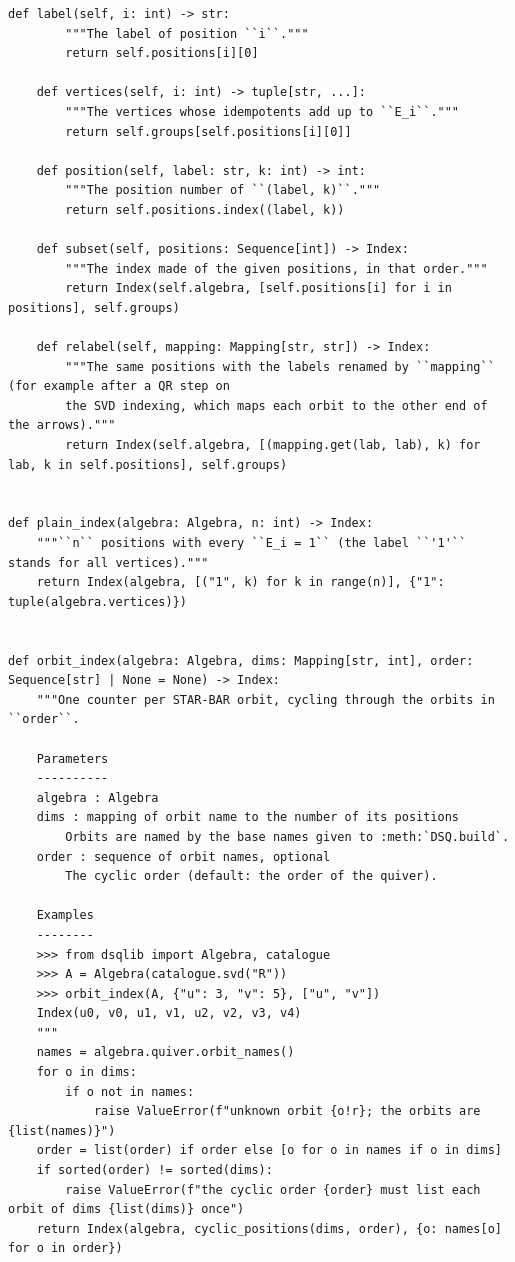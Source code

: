 \documentclass[12pt, a4paper]{report}
\theoremstyle{plain}
\theoremstyle{definition}
\theoremstyle{remark}
\theoremstyle{plain}
\begin{document}
\begin{lstlisting}[style=dsqcode]
    def label(self, i: int) -> str:
        """The label of position ``i``."""
        return self.positions[i][0]

    def vertices(self, i: int) -> tuple[str, ...]:
        """The vertices whose idempotents add up to ``E_i``."""
        return self.groups[self.positions[i][0]]

    def position(self, label: str, k: int) -> int:
        """The position number of ``(label, k)``."""
        return self.positions.index((label, k))

    def subset(self, positions: Sequence[int]) -> Index:
        """The index made of the given positions, in that order."""
        return Index(self.algebra, [self.positions[i] for i in positions], self.groups)

    def relabel(self, mapping: Mapping[str, str]) -> Index:
        """The same positions with the labels renamed by ``mapping`` (for example after a QR step on
        the SVD indexing, which maps each orbit to the other end of the arrows)."""
        return Index(self.algebra, [(mapping.get(lab, lab), k) for lab, k in self.positions], self.groups)


def plain_index(algebra: Algebra, n: int) -> Index:
    """``n`` positions with every ``E_i = 1`` (the label ``'1'`` stands for all vertices)."""
    return Index(algebra, [("1", k) for k in range(n)], {"1": tuple(algebra.vertices)})


def orbit_index(algebra: Algebra, dims: Mapping[str, int], order: Sequence[str] | None = None) -> Index:
    """One counter per STAR-BAR orbit, cycling through the orbits in ``order``.

    Parameters
    ----------
    algebra : Algebra
    dims : mapping of orbit name to the number of its positions
        Orbits are named by the base names given to :meth:`DSQ.build`.
    order : sequence of orbit names, optional
        The cyclic order (default: the order of the quiver).

    Examples
    --------
    >>> from dsqlib import Algebra, catalogue
    >>> A = Algebra(catalogue.svd("R"))
    >>> orbit_index(A, {"u": 3, "v": 5}, ["u", "v"])
    Index(u0, v0, u1, v1, u2, v2, v3, v4)
    """
    names = algebra.quiver.orbit_names()
    for o in dims:
        if o not in names:
            raise ValueError(f"unknown orbit {o!r}; the orbits are {list(names)}")
    order = list(order) if order else [o for o in names if o in dims]
    if sorted(order) != sorted(dims):
        raise ValueError(f"the cyclic order {order} must list each orbit of dims {list(dims)} once")
    return Index(algebra, cyclic_positions(dims, order), {o: names[o] for o in order})



\end{lstlisting}
\end{document}
